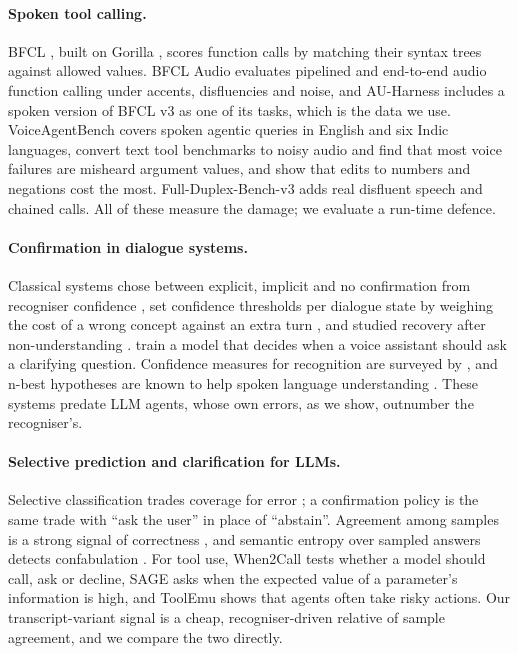 \documentclass[11pt]{article}
\begin{document}
\paragraph{Spoken tool calling.} BFCL \citep{patil2025bfcl}, built on Gorilla \citep{patil2023gorilla}, scores function calls by matching their syntax trees against allowed values. BFCL Audio \citep{mao2026bfclaudio} evaluates pipelined and end-to-end audio function calling under accents, disfluencies and noise, and AU-Harness \citep{nguyen2025auharness} includes a spoken version of BFCL v3 as one of its tasks, which is the data we use. VoiceAgentBench \citep{jain2025voiceagentbench} covers spoken agentic queries in English and six Indic languages, \citet{laskar2026texttovoice} convert text tool benchmarks to noisy audio and find that most voice failures are misheard argument values, and \citet{wang2026speechevalx} show that edits to numbers and negations cost the most. Full-Duplex-Bench-v3 \citep{lin2026fullduplexbenchv3} adds real disfluent speech and chained calls. All of these measure the damage; we evaluate a run-time defence.

\paragraph{Confirmation in dialogue systems.} Classical systems chose between explicit, implicit and no confirmation from recogniser confidence \citep{sturm1999arise,bouwman1999confidence}, set confidence thresholds per dialogue state by weighing the cost of a wrong concept against an extra turn \citep{bohus2005rejection}, and studied recovery after non-understanding \citep{bohus2005sorry}. \citet{kim2021clarifying} train a model that decides when a voice assistant should ask a clarifying question. Confidence measures for recognition are surveyed by \citet{jiang2005confidence}, and n-best hypotheses are known to help spoken language understanding \citep{li2020nbest,ganesan2021nbest}. These systems predate LLM agents, whose own errors, as we show, outnumber the recogniser's.

\paragraph{Selective prediction and clarification for LLMs.} Selective classification trades coverage for error \citep{geifman2017selective,kamath2020selective}; a confirmation policy is the same trade with ``ask the user'' in place of ``abstain''. Agreement among samples is a strong signal of correctness \citep{wang2023selfconsistency}, and semantic entropy over sampled answers detects confabulation \citep{kuhn2023semantic,farquhar2024semanticentropy}. For tool use, When2Call \citep{ross2025when2call} tests whether a model should call, ask or decline, SAGE \citep{suri2026sage} asks when the expected value of a parameter's information is high, and ToolEmu \citep{ruan2024toolemu} shows that agents often take risky actions. Our transcript-variant signal is a cheap, recogniser-driven relative of sample agreement, and we compare the two directly.
\end{document}
